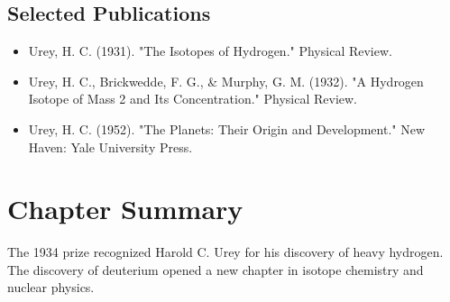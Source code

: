 \subsection*{Selected Publications}

\begin{itemize}

\item Urey, H. C. (1931). "The Isotopes of Hydrogen." Physical Review.

\item Urey, H. C., Brickwedde, F. G., \& Murphy, G. M. (1932). "A Hydrogen Isotope of Mass 2 and Its Concentration." Physical Review.

\item Urey, H. C. (1952). "The Planets: Their Origin and Development." New Haven: Yale University Press.

\end{itemize}

\clearpage

\section*{Chapter Summary}

The 1934 prize recognized Harold C. Urey for his discovery of heavy hydrogen. The discovery of deuterium opened a new chapter in isotope chemistry and nuclear physics.
